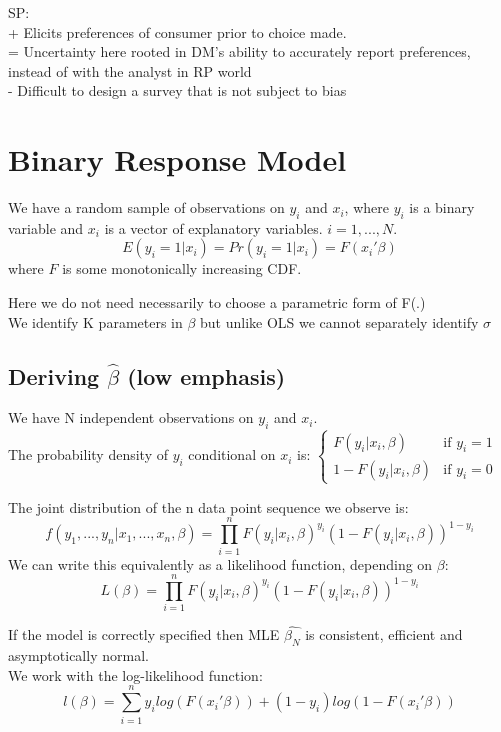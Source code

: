 \documentclass[DIV=14,titlepage=false]{scrreprt}
\begin{document}
SP:\\
+ Elicits preferences of consumer prior to choice made.\\
= Uncertainty here rooted in DM's ability to accurately report preferences, instead of with the analyst in RP world\\
- Difficult to design a survey that is not subject to bias

\section{Binary Response Model}
We have a random sample of observations on \(y_i\) and \(x_i\), where \(y_i\) is a binary variable and \(x_i\) is a vector of explanatory variables. \(i=1,...,N\).\\
\[E(y_i=1|x_i)=Pr(y_i=1|x_i)=F(x_i'\beta)\]
where \(F\) is some monotonically increasing CDF.\\

\begin{note}
    Here we do not need necessarily to choose a parametric form of F(.)\\
    We identify K parameters in \(\beta\) but unlike OLS we cannot separately identify \(\sigma\)
\end{note}

\subsection{Deriving \(\hat{\beta}\) (low emphasis)}

We have N independent observations on \(y_i\) and \(x_i\).\\
The probability density of \(y_i\) conditional on \(x_i\) is:
\(
\begin{cases}
    F(y_i|x_i,\beta) & \text{if } y_i=1\\
    1-F(y_i|x_i,\beta) & \text{if } y_i=0
\end{cases}
\)

The joint distribution of the n data point sequence we observe is:
\[f(y_1,...,y_n|x_1,...,x_n,\beta)=\prod_{i=1}^n F(y_i|x_i,\beta)^{y_i}(1-F(y_i|x_i,\beta))^{1-y_i}\]
We can write this equivalently as a likelihood function, depending on \(\beta\):
\[L(\beta)=\prod_{i=1}^n F(y_i|x_i,\beta)^{y_i}(1-F(y_i|x_i,\beta))^{1-y_i}\]

If the model is correctly specified then MLE \(\hat{\beta_N}\) is consistent, efficient and asymptotically normal.\\

We work with the log-likelihood function:
\[l(\beta)=\sum_{i=1}^n y_i log(F(x_i'\beta))+(1-y_i)log(1-F(x_i'\beta))\]
\end{document}
